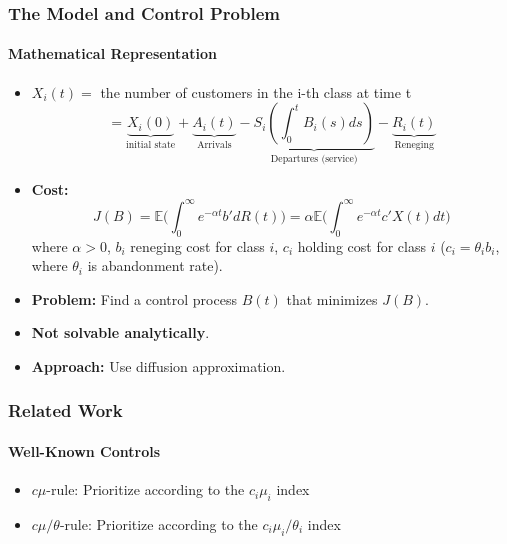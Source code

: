 \documentclass{beamer}
\begin{document}
\begin{frame}
  \frametitle{The Model and Control Problem}
  \framesubtitle{Mathematical Representation}

  \vfill
  \begin{itemize}[<+->]
  \item $X_i(t)=$ the number of customers in the i-th class at time t
    \[
    =\underbrace{X_i(0)}_\text{initial state}+\underbrace{A_i(t)}_\text{Arrivals}-\underbrace{S_i(\int_0^t B_i(s)ds)}_\text{Departures (service)}-\underbrace{R_i(t)}_\text{Reneging}
    \]
    \vfill
  \item {\bf Cost:}
    \[
    J(B)=\mathbb{E} \Big(\int_{0}^{\infty} e^{-\alpha t} b' dR(t)\Big)=\alpha \mathbb{E} \Big(\int_{0}^{\infty} e^{-\alpha t} c' X(t)dt\Big)
    \]
      {\small where $\alpha>0$, $b_i$ reneging cost for class $i$, $c_i$ holding cost for class $i$ ($c_i=\theta_i b_i$, where $\theta_i$ is abandonment rate).} 
      \vfill
    \item {\bf Problem:} Find a control process $B(t)$ that minimizes $J(B)$.
      \vfill
    \item {\bf Not solvable analytically}.
      \vfill
    \item {\bf Approach:} Use diffusion approximation.
  \end{itemize}
  \vfill




\end{frame}

\begin{frame}
  \frametitle{Related Work}
  \framesubtitle{Well-Known Controls}
  
  \onslide<+->
      {
      }
      \vfill
      \begin{itemize}[<+->]%
      \item $c\mu$-rule: Prioritize according to the $c_i\mu_i$ index \\
        \vfill
        \vfill
        \vfill
      \item $c\mu/\theta$-rule: Prioritize according to the $c_i\mu_i/\theta_i$ index\\
        \vfill
      \end{itemize}
      \vfill
      \vfill
\end{frame}
\end{document}
